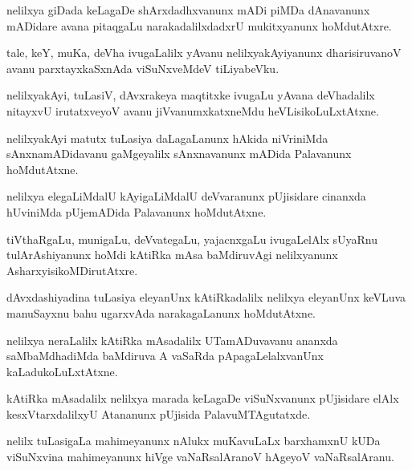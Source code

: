 \documentclass{article}
\begin{document}
\begin{mn}%
nelilxya giDada keLagaDe shArxdadhxvanunx mADi piMDa dAnavanunx mADidare avana pitaqgaLu 
narakadalilxdadxrU mukitxyanunx hoMdutAtxre.
\end{mn}

\begin{mn}%
tale, keY, muKa, deVha ivugaLalilx yAvanu nelilxyakAyiyanunx dharisiruvanoV avanu parxtayxkaSxnAda 
viSuNxveMdeV tiLiyabeVku.
\end{mn}

\begin{mn}%
nelilxyakAyi, tuLasiV, dAvxrakeya maqtitxke ivugaLu yAvana deVhadalilx nitayxvU irutatxveyoV avanu 
jiVvanumxkatxneMdu heVLisikoLuLxtAtxne.
\end{mn}

\begin{mn}%
nelilxyakAyi matutx tuLasiya daLagaLanunx hAkida niVriniMda sAnxnamADidavanu gaMgeyalilx 
sAnxnavanunx mADida Palavanunx hoMdutAtxne.
\end{mn}

\begin{mn}%
nelilxya elegaLiMdalU kAyigaLiMdalU deVvaranunx pUjisidare cinanxda hUviniMda pUjemADida Palavanunx 
hoMdutAtxne.
\end{mn}

\begin{mn}%
tiVthaRgaLu, munigaLu, deVvategaLu, yajacnxgaLu ivugaLelAlx sUyaRnu tulArAshiyanunx hoMdi kAtiRka 
mAsa baMdiruvAgi nelilxyanunx AsharxyisikoMDirutAtxre.
\end{mn}

\begin{mn}%
dAvxdashiyadina tuLasiya eleyanUnx kAtiRkadalilx nelilxya eleyanUnx keVLuva manuSayxnu bahu 
ugarxvAda narakagaLanunx hoMdutAtxne.
\end{mn}

\begin{mn}%
nelilxya neraLalilx kAtiRka mAsadalilx UTamADuvavanu ananxda saMbaMdhadiMda baMdiruva A vaSaRda 
pApagaLelalxvanUnx kaLadukoLuLxtAtxne.
\end{mn}

\begin{mn}%
kAtiRka mAsadalilx nelilxya marada keLagaDe viSuNxvanunx pUjisidare elAlx kesxVtarxdalilxyU 
Atananunx pUjisida PalavuMTAgutatxde.
\end{mn}

\begin{mn}%
nelilx tuLasigaLa mahimeyanunx nAlukx muKavuLaLx barxhamxnU kUDa viSuNxvina mahimeyanunx hiVge 
vaNaRsalAranoV hAgeyoV vaNaRsalAranu.
\end{mn}
\end{document}
